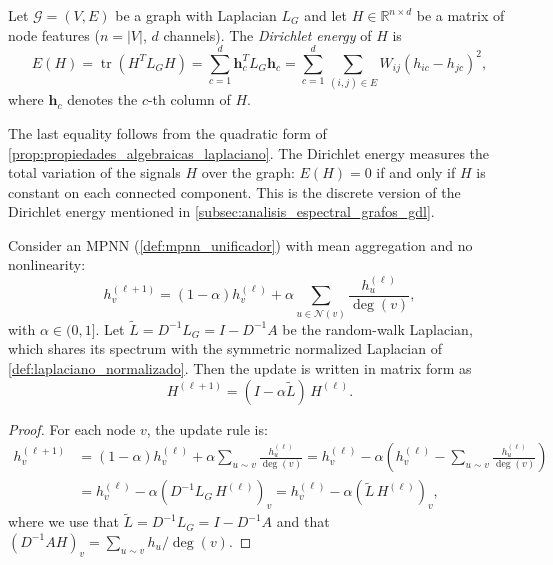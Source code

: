 \begin{definition}\label{def:energia_dirichlet_grafos}
	Let $\mathcal{G} = (V, E)$ be a graph with Laplacian $L_G$ and let $H \in \mathbb{R}^{n \times d}$ be a matrix of node features ($n = |V|$, $d$ channels). The \textit{Dirichlet energy} of $H$ is
	\[
		E(H) = \operatorname{tr}(H^T L_G H) = \sum_{c=1}^{d} \mathbf{h}_c^T L_G \mathbf{h}_c = \sum_{c=1}^{d} \sum_{(i,j) \in E} W_{ij}(h_{ic} - h_{jc})^2,
	\]
	where $\mathbf{h}_c$ denotes the $c$-th column of $H$.
\end{definition}

The last equality follows from the quadratic form of \autoref{prop:propiedades_algebraicas_laplaciano}. The Dirichlet energy measures the total variation of the signals $H$ over the graph: $E(H) = 0$ if and only if $H$ is constant on each connected component. This is the discrete version of the Dirichlet energy mentioned in \autoref{subsec:analisis_espectral_grafos_gdl}.

\begin{proposition}\label{prop:mpnn_difusion}
	Consider an \gls{MPNN} (\autoref{def:mpnn_unificador}) with mean aggregation and no nonlinearity:
	\[
		h_v^{(\ell+1)} = (1 - \alpha) h_v^{(\ell)} + \alpha \sum_{u \in \mathcal{N}(v)} \frac{h_u^{(\ell)}}{\deg(v)},
	\]
	with $\alpha \in (0, 1]$. Let $\tilde{L} = D^{-1}L_G = I - D^{-1}A$ be the random-walk Laplacian, which shares its spectrum with the symmetric normalized Laplacian of \autoref{def:laplaciano_normalizado}. Then the update is written in matrix form as
	\begin{equation}\label{eq:difusion_discreta}
		H^{(\ell+1)} = (I - \alpha \tilde{L})\, H^{(\ell)}.
	\end{equation}
\end{proposition}

\begin{proof}
	For each node $v$, the update rule is:
	\begin{align*}
		h_v^{(\ell+1)} &= (1-\alpha) h_v^{(\ell)} + \alpha \sum_{u \sim v} \frac{h_u^{(\ell)}}{\deg(v)} = h_v^{(\ell)} - \alpha\left(h_v^{(\ell)} - \sum_{u \sim v} \frac{h_u^{(\ell)}}{\deg(v)}\right)\\
		&= h_v^{(\ell)} - \alpha (D^{-1}L_G\, H^{(\ell)})_v = h_v^{(\ell)} - \alpha (\tilde{L}\, H^{(\ell)})_v,
	\end{align*}
	where we use that $\tilde{L} = D^{-1}L_G = I - D^{-1}A$ and that $(D^{-1}A H)_v = \sum_{u \sim v} h_u / \deg(v)$.
\end{proof}

